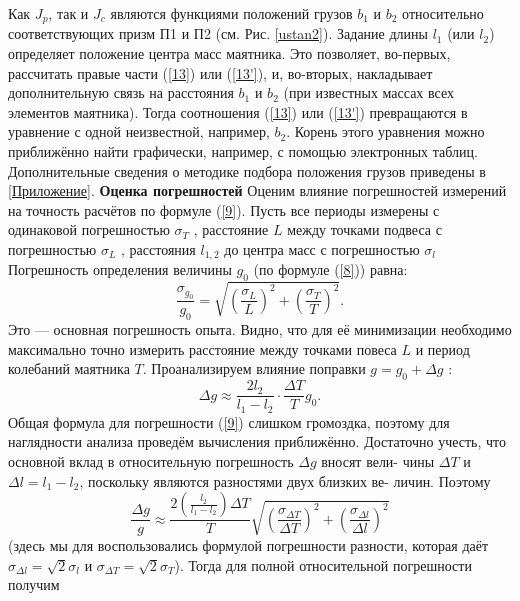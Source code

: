 \documentclass[a4paper, 12pt]{article}
\begin{document}
Как $J_p$, так и $J_c$ являются функциями положений грузов $b_1$ и $b_2$ относительно соответствующих призм П1 и П2 (см. Рис. \ref{ustan2}). Задание длины $l_1$ (или $l_2$) определяет положение центра масс маятника. Это позволяет, во-первых, рассчитать правые части (\ref{13}) или (\ref{13'}), и, во-вторых, накладывает дополнительную связь на расстояния $b_1$ и $b_2$ (при известных массах всех элементов маятника). Тогда соотношения (\ref{13}) или (\ref{13'}) превращаются в уравнение с одной неизвестной, например, $b_2$. Корень этого уравнения можно приближённо найти графически, например, с помощью электронных таблиц. Дополнительные сведения о методике подбора положения грузов приведены в \ref{Приложение}.\newline
\textbf{Оценка погрешностей}
Оценим влияние погрешностей измерений на точность расчётов по формуле (\ref{9}). Пусть все периоды измерены с одинаковой погрешностью $\sigma_T $ , расстояние $L$ между точками подвеса с погрешностью $\sigma_L$ , расстояния $l_{1,2}$ до центра масс с погрешностью $\sigma_l$ Погрешность определения величины $g_0$
(по формуле (\ref{8})) равна: \newline
\begin{equation}
    \label{14}
    \frac{\sigma_{g_0}}{g_0} = \sqrt{(\frac{\sigma_L}{L})^2 + (\frac{\sigma_T}{T})^2 }.
\end{equation}
Это — основная погрешность опыта. Видно, что для её минимизации необходимо максимально точно измерить расстояние между точками повеса $L$ и период колебаний маятника $T$. \newline 
Проанализируем влияние поправки $g = g_0 + \Delta{g}$ : \newline
\[
\Delta{g} \approx \frac{2l_2}{l_1 - l_2}\cdot\frac{\Delta{T}}{T}g_0 .
\]
Общая формула для погрешности (\ref{9}) слишком громоздка, поэтому для наглядности анализа проведём вычисления приближённо. Достаточно учесть, что основной вклад в относительную погрешность $\Delta{g}$ вносят вели-
чины $\Delta{T}$ и $\Delta{l} = l_1 - l_2$, поскольку являются разностями двух близких ве-
личин. Поэтому \newline
\[
\frac{\Delta{g}}{g} \approx \frac{2(\frac{l_2}{l_1 - l_2}) \Delta{T}}{T} \sqrt{(\frac{\sigma_{\Delta{T}}}{\Delta{T}})^2 + (\frac{\sigma_{\Delta{l}}}{\Delta{l}})^2 }
\]
(здесь мы для воспользовались формулой погрешности разности, которая
даёт $\sigma_{\Delta{l}} = \sqrt{2}\sigma_{l}$ и $\sigma_{\Delta{T}} = \sqrt{2}\sigma_{T}$). Тогда для полной относительной погрешности получим \newline
\end{document}
